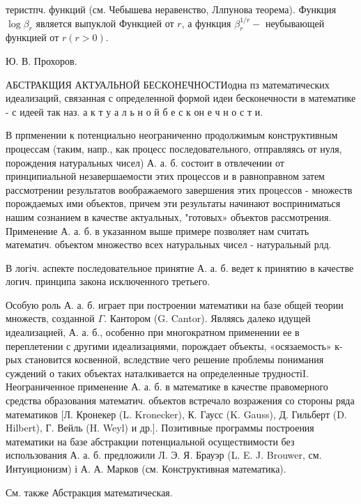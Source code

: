 \documentclass[10pt]{article}
\begin{document}
теристпч. функций (см. Чебышева неравенство, Ллпунова теорема). Функция $\log \beta_{r}$ является выпуклой Функцией от $r$, а функция $\beta_{r}^{1 / r}-$ неубывающей функцией от $r(r>0)$.



Ю. В. Прохоров.



АБСТРАКЩИЯ АКТУАЛЬНОЙ БЕСКОНЕЧНОСТИодна пз математических идеализаций, связанная с определенной формой идеи бесконечности в математике - с идеей так наз. а к т у а л ь н о й б е с к он е ч н о с т и.



В прпменении к потенциально неограниченно продолжимым конструктивным процессам (таким, напр., как процесс последовательного, отправляясь от нуля, порождения натуральных чисел) А. а. б. состоит в отвлечении от принципиальной незавершаемости этих процессов и в равноправном затем рассмотрении результатов воображаемого завершения этих процессов - множеств порождаемых ими объектов, причем эти результаты начинают восприниматься нашим сознанием в качестве актуальных, "готовых» объектов рассмотрения. Применение А. а. б. в указанном выше примере позволяет нам считать математич. объектом множество всех натуральных чисел - натуральный рлд.



В логіч. аспекте последовательное принятие А. а. б. ведет к принятию в качестве логич. принципа закона исключенного третьего.



Особую роль А. а. б. играет при построении математики на базе общей теории множеств, созданной $\Gamma$. Кантором (G. Cantor). Являясь далеко идущей идеализацией, А. а. б., особенно при многократном применении ее в переплетении с другими идеализациями, порождает объекты, «осязаемость» к-рых становится косвенной, вследствие чего решение проблемы понимания суждений о таких объектах наталкивается на определенные трудностіI. Неограниченное применение А. а. б. в математике в качестве правомерного средства образования математич. объектов встречало возражения со стороны ряда математиков [Л. Кронекер (L. Kronecker), К. Гаусс (K. Gauss), Д. Гильберт (D. Hilbert), Г. Вейль (H. Weyl) и др.]. Позитивные программы построения математики на базе абстракции потенциальной осуществимости без использования А. а. б. предложили Л. Э. Я. Брауэр (L. E. J. Brouwer, см. Интуиционизм) і А. А. Марков (см. Конструктивная математика).



См. также Абстракция математическая.
\end{document}

